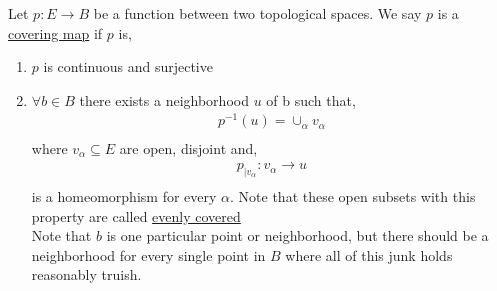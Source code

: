 \documentclass[../notes.tex]{subfiles}
\begin{document}
            \begin{definition} Let $p:E \rightarrow B$ be a function between two topological spaces. We say
                $p$ is a \underline{covering map} if $p$ is,
                \begin{enumerate}
                    \item $p$ is continuous and surjective
                    \item $\forall b\in B$ there exists a neighborhood $u$ of b such that,
                        \begin{align*}
                            p^{-1}(u)=\cup_{\alpha}v_{\alpha}\\
                        \end{align*}
                        where $v_\alpha\subseteq E$ are open, disjoint and,
                        \begin{align*}
                            p_{|v_{\alpha}}:v_{\alpha}\rightarrow u\\
                        \end{align*}
                        is a homeomorphism for every $\alpha$. Note that these open subsets with this property are called
                        \underline{evenly covered}\\
                        Note that $b$ is one particular point or neighborhood, but there should be a neighborhood for every single
                        point in $B$ where all of this junk holds reasonably truish.
                \end{enumerate}
            \end{definition}
\end{document}
